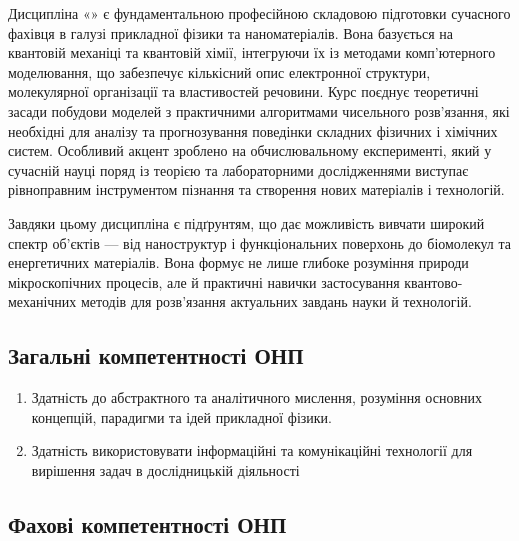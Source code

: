 \documentclass{Syllabus}
\begin{document}

Дисципліна «\discipline» є фундаментальною професійною складовою підготовки сучасного фахівця в галузі прикладної фізики та наноматеріалів. Вона базується на квантовій механіці та квантовій хімії, інтегруючи їх із методами комп'ютерного моделювання, що забезпечує кількісний опис електронної структури, молекулярної організації та властивостей речовини. Курс поєднує теоретичні засади побудови моделей з практичними алгоритмами чисельного розв’язання, які необхідні для аналізу та прогнозування поведінки складних фізичних і хімічних систем. Особливий акцент зроблено на обчислювальному експерименті, який у сучасній науці поряд із теорією та лабораторними дослідженнями виступає рівноправним інструментом пізнання та створення нових матеріалів і технологій.

Завдяки цьому дисципліна є підґрунтям, що дає можливість вивчати широкий спектр об’єктів --- від наноструктур і функціональних поверхонь до біомолекул та енергетичних матеріалів. Вона формує не лише глибоке розуміння природи мікроскопічних процесів, але й практичні навички застосування квантово-механічних методів для розв’язання актуальних завдань науки й технологій.

\subsection*{Загальні компетентності ОНП}

\begin{enumerate}
    \item [ЗК 1:] Здатність до абстрактного та аналітичного мислення, розуміння основних концепцій, парадигми та ідей прикладної фізики.
    \item [ЗК 5:] Здатність використовувати інформаційні та комунікаційні технології для вирішення задач в дослідницькій діяльності
\end{enumerate}

\subsection*{Фахові компетентності ОНП}
\end{document}
